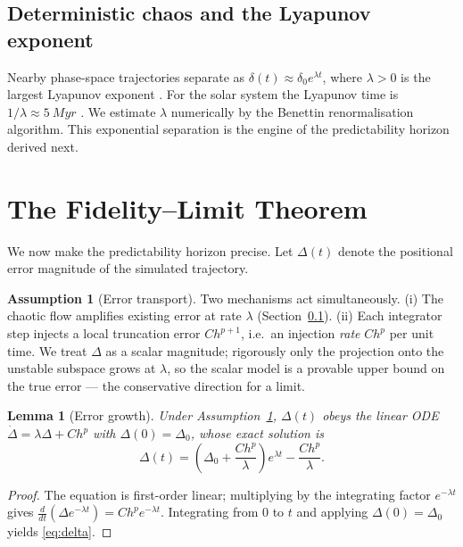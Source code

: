 \documentclass[11pt]{article}
\newtheorem{lemma}{Lemma}
\theoremstyle{definition}
\newtheorem{assumption}{Assumption}
\begin{document}
\subsection{Deterministic chaos and the Lyapunov exponent}
\label{sec:chaos}
Nearby phase-space trajectories separate as $\delta(t) \approx \delta_0
e^{\lambda t}$, where $\lambda>0$ is the largest Lyapunov exponent
\cite{lyapunov1892, benettin1980}. For the solar system the Lyapunov time is
$1/\lambda \approx \SI{5}{Myr}$ \cite{laskar1989, sussmanwisdom1992}. We
estimate $\lambda$ numerically by the Benettin renormalisation algorithm. This
exponential separation is the engine of the predictability horizon derived next.

\section{The Fidelity--Limit Theorem}
\label{sec:theorem}

We now make the predictability horizon precise. Let $\Delta(t)$ denote the
positional error magnitude of the simulated trajectory.

\begin{assumption}[Error transport]
\label{ass:transport}
Two mechanisms act simultaneously. \textup{(i)} The chaotic flow amplifies
existing error at rate $\lambda$ \textup{(Section~\ref{sec:chaos})}.
\textup{(ii)} Each integrator step injects a local truncation error
$C h^{p+1}$, i.e.\ an injection \emph{rate} $C h^{p}$ per unit time. We treat
$\Delta$ as a scalar magnitude; rigorously only the projection onto the
unstable subspace grows at $\lambda$, so the scalar model is a provable upper
bound on the true error --- the conservative direction for a limit.
\end{assumption}

\begin{lemma}[Error growth]
\label{lem:growth}
Under Assumption~\ref{ass:transport}, $\Delta(t)$ obeys the linear ODE
$\dot\Delta = \lambda\Delta + C h^{p}$ with $\Delta(0)=\Delta_0$, whose exact
solution is
\begin{equation}
\label{eq:delta}
\Delta(t) = \left(\Delta_0 + \frac{C h^{p}}{\lambda}\right) e^{\lambda t}
- \frac{C h^{p}}{\lambda}.
\end{equation}
\end{lemma}
\begin{proof}
The equation is first-order linear; multiplying by the integrating factor
$e^{-\lambda t}$ gives $\frac{d}{dt}(\Delta e^{-\lambda t}) = C h^p e^{-\lambda
t}$. Integrating from $0$ to $t$ and applying $\Delta(0)=\Delta_0$ yields
\eqref{eq:delta}.
\end{proof}
\end{document}
